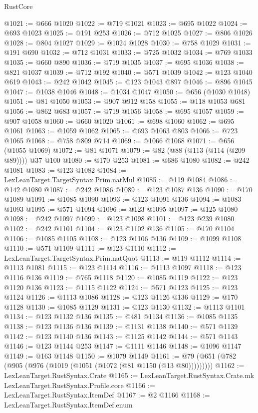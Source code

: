 \begin{lexlean}{RustCore}
\begin{coremodule}
@1021 := @666 @1020
@1022 := @719 @1021
@1023 := @695 @1022
@1024 := @693 @1023
@1025 := @191 @253
@1026 := @712 @1025
@1027 := @806 @1026
@1028 := @804 @1027
@1029 := @1024 @1028
@1030 := @758 @1029
@1031 := @191 @690
@1032 := @712 @1031
@1033 := @725 @1032
@1034 := @769 @1033
@1035 := @660 @890
@1036 := @719 @1035
@1037 := @695 @1036
@1038 := @821 @1037
@1039 := @712 @192
@1040 := @571 @1039
@1042 := @123 @1040 @619
@1043 := @242 @1042
@1045 := @123 @1043 @897
@1046 := @896 @1045
@1047 := @1038 @1046
@1048 := @1034 @1047
@1050 := @656 (@1030 @1048)
@1051 := @81 @1050
@1053 := @907 @912 @158
@1055 := @118 @1053 @681
@1056 := @862 @683
@1057 := @719 @1056
@1058 := @695 @1057
@1059 := @907 @1058
@1060 := @660 @1020
@1061 := @698 @1060
@1062 := @695 @1061
@1063 := @1059 @1062
@1065 := @693 @1063 @803
@1066 := @723 @1065
@1068 := @758 @809 @714
@1069 := @1066 @1068
@1071 := @656 (@1055 @1069)
@1072 := @81 @1071
@1079 := @82 (@88 (@113 (@114 (@209 @89)))) @37 @100
@1080 := @170 @253
@1081 := @686 @1080
@1082 := @242 @1081
@1083 := @123 @1082
@1084 := LexLeanTarget.TargetSyntax.Prim.natMul
@1085 := @119 @1084
@1086 := @142 @1080
@1087 := @242 @1086
@1089 := @123 @1087 @136
@1090 := @170 @1089
@1091 := @1085 @1090
@1093 := @123 @1091 @136
@1094 := @1083 @1093
@1095 := @571 @1094
@1096 := @123 @1095
@1097 := @125 @1080
@1098 := @242 @1097
@1099 := @123 @1098
@1101 := @123 @239 @1080
@1102 := @242 @1101
@1104 := @123 @1102 @136
@1105 := @170 @1104
@1106 := @1085 @1105
@1108 := @123 @1106 @136
@1109 := @1099 @1108
@1110 := @571 @1109
@1111 := @123 @1110
@1112 := LexLeanTarget.TargetSyntax.Prim.natQuot
@1113 := @119 @1112
@1114 := @1113 @1081
@1115 := @123 @1114
@1116 := @1113 @1097
@1118 := @123 @1116 @136
@1119 := @765 @1118
@1120 := @1085 @1119
@1122 := @123 @1120 @136
@1123 := @1115 @1122
@1124 := @571 @1123
@1125 := @123 @1124
@1126 := @1113 @1086
@1128 := @123 @1126 @136
@1129 := @170 @1128
@1130 := @1085 @1129
@1131 := @123 @1130
@1132 := @1113 @1101
@1134 := @123 @1132 @136
@1135 := @481 @1134
@1136 := @1085 @1135
@1138 := @123 @1136 @136
@1139 := @1131 @1138
@1140 := @571 @1139
@1142 := @123 @1140 @136
@1143 := @1125 @1142
@1144 := @571 @1143
@1146 := @123 @1144 @253
@1147 := @1111 @1146
@1148 := @1096 @1147
@1149 := @163 @1148
@1150 := @1079 @1149
@1161 := @79 (@651 (@782 (@905 (@976 (@1019 (@1051 (@1072 (@81 @1150 (@13 @80)))))))))
@1162 := LexLeanTarget.RustSyntax.Crate
@1165 := LexLeanTarget.RustSyntax.Crate.mk LexLeanTarget.RustSyntax.Profile.core
@1166 := LexLeanTarget.RustSyntax.ItemDef
@1167 := @2 @1166
@1168 := LexLeanTarget.RustSyntax.ItemDef.enum

\end{coremodule}
\end{lexlean}
